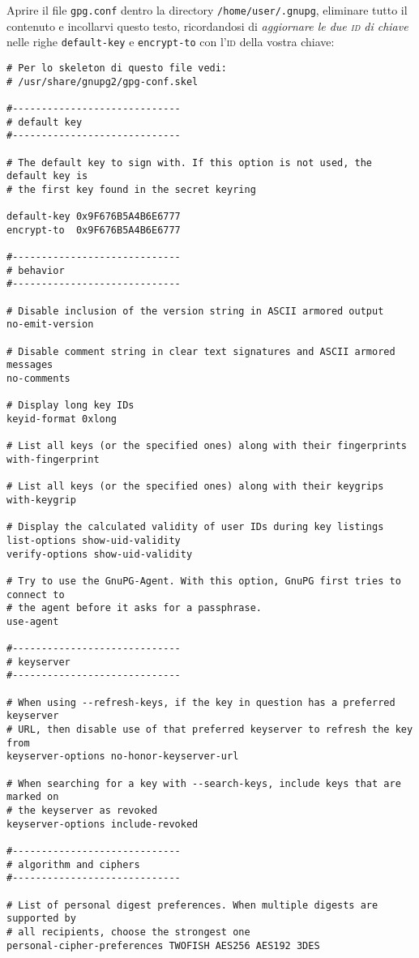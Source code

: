 Aprire il file \texttt{gpg.conf} dentro la directory \texttt{/home/user/.gnupg},
eliminare tutto il contenuto e incollarvi questo testo, ricordandosi di
\emph{aggiornare le due \textsc{id} di chiave} nelle righe
\texttt{default-key} e \texttt{encrypt-to} con l'\textsc{id} della vostra
chiave:

\begin{lstlisting}
# Per lo skeleton di questo file vedi:
# /usr/share/gnupg2/gpg-conf.skel

#-----------------------------
# default key
#-----------------------------

# The default key to sign with. If this option is not used, the default key is
# the first key found in the secret keyring

default-key 0x9F676B5A4B6E6777
encrypt-to  0x9F676B5A4B6E6777

#-----------------------------
# behavior
#-----------------------------

# Disable inclusion of the version string in ASCII armored output
no-emit-version

# Disable comment string in clear text signatures and ASCII armored messages
no-comments

# Display long key IDs
keyid-format 0xlong

# List all keys (or the specified ones) along with their fingerprints
with-fingerprint

# List all keys (or the specified ones) along with their keygrips
with-keygrip

# Display the calculated validity of user IDs during key listings
list-options show-uid-validity
verify-options show-uid-validity

# Try to use the GnuPG-Agent. With this option, GnuPG first tries to connect to
# the agent before it asks for a passphrase.
use-agent

#-----------------------------
# keyserver
#-----------------------------

# When using --refresh-keys, if the key in question has a preferred keyserver
# URL, then disable use of that preferred keyserver to refresh the key from
keyserver-options no-honor-keyserver-url

# When searching for a key with --search-keys, include keys that are marked on
# the keyserver as revoked
keyserver-options include-revoked

#-----------------------------
# algorithm and ciphers
#-----------------------------

# List of personal digest preferences. When multiple digests are supported by
# all recipients, choose the strongest one
personal-cipher-preferences TWOFISH AES256 AES192 3DES


\end{lstlisting}
